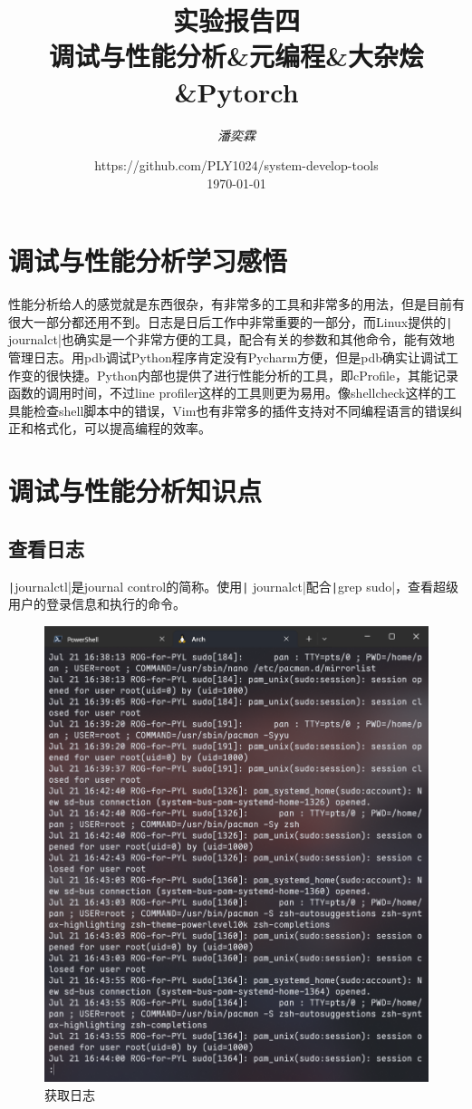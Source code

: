 \documentclass[fontset=ubuntu]{ctexart}
\title{\Huge \textbf{实验报告四 \\ 调试与性能分析\&元编程\&大杂烩\&Pytorch}}
\author{\textit{潘奕霖}}
\date{https://github.com/PLY1024/system-develop-tools\\ \today}
\begin{document}
\maketitle
\newpage

\tableofcontents
\newpage

\section{调试与性能分析学习感悟}
性能分析给人的感觉就是东西很杂，有非常多的工具和非常多的用法，但是目前有很大一部分都还用不到。日志是日后工作中非常重要的一部分，而Linux提供的\texttt| journalct|也确实是一个非常方便的工具，配合有关的参数和其他命令，能有效地管理日志。用pdb调试Python程序肯定没有Pycharm方便，但是pdb确实让调试工作变的很快捷。Python内部也提供了进行性能分析的工具，即cProfile，其能记录函数的调用时间，不过line profiler这样的工具则更为易用。像shellcheck这样的工具能检查shell脚本中的错误，Vim也有非常多的插件支持对不同编程语言的错误纠正和格式化，可以提高编程的效率。

\section{调试与性能分析知识点}
\subsection{查看日志}
\texttt|journalctl|是journal control的简称。使用\texttt| journalct|配合\texttt|grep sudo|，查看超级用户的登录信息和执行的命令。
\begin{figure}[htb]
    \centering
    \includegraphics[width=0.5\linewidth]{journalctl_1.png}
    \caption{获取日志}
    \label{fig:journalctl_1}
\end{figure}
\end{document}
